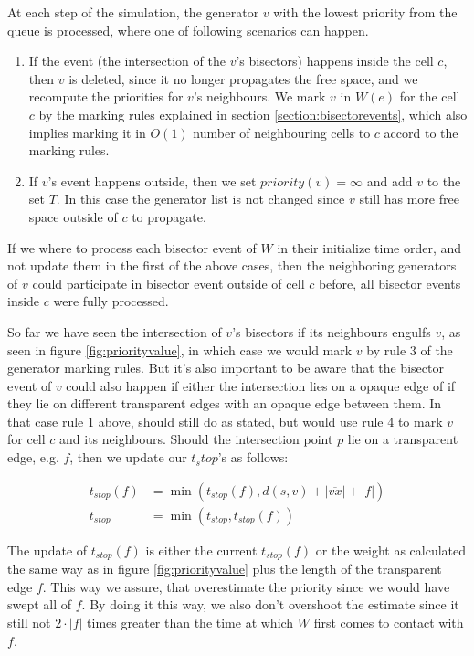At each step of the simulation, the generator $v$ with the lowest priority from the queue is processed, where one of following 
scenarios can happen.

\begin{enumerate}
    \item  If the event (the intersection of the $v$'s bisectors) happens inside the cell $c$, then $v$ is deleted, since it no longer 
           propagates the free space, and we recompute the priorities for $v$'s neighbours. We mark $v$ in $W(e)$ for the cell $c$ by 
           the marking rules explained in section \ref{section:bisectorevents}, which also implies marking it in $O(1)$ number of 
           neighbouring cells to $c$ accord to the marking rules.
    \item If $v$'s event happens outside, then we set $priority(v) = \infty$ and add $v$ to the set $T$. In this case the generator 
          list is not changed since $v$ still has more free space outside of $c$ to propagate.
\end{enumerate}

If we where to process each bisector event of $W$ in their initialize time order, and not update them in the first of the above cases, 
then the neighboring generators of $v$ could participate in bisector event outside of cell $c$ before, all bisector events inside $c$ 
were fully processed. 

So far we have seen the intersection of $v$'s bisectors if its neighbours engulfs $v$, as seen in figure \ref{fig:priorityvalue}, in 
which case we would mark $v$ by rule 3 of the generator marking rules. But it's also important to be aware that the bisector event of 
$v$ could also happen if either the intersection lies on a opaque edge of if they lie on different transparent edges with an opaque 
edge between them. In that case rule 1 above, should still do as stated, but would use rule 4 to mark $v$ for cell $c$ and its 
neighbours. Should the intersection point $p$ lie on a transparent edge, e.g. $f$, then we update our $t_stop$'s as follows:

\begin{align*}
    t_{stop}(f) &= \min(t_{stop}(f), d(s,v) + |\overline{vx}| + |f|) \\
    t_{stop}    &= \min(t_{stop}, t_{stop}(f))
\end{align*}

The update of $t_{stop}(f)$ is either the current $t_{stop}(f)$ or the weight as calculated the same way as in figure 
\ref{fig:priorityvalue} plus the length of the transparent edge $f$. This way we assure, that overestimate the priority since we would 
have swept all of $f$. By doing it this way, we also don't overshoot the estimate since it still not $2\cdot|f|$ times greater than the
time at which $W$ first comes to contact with $f$.

